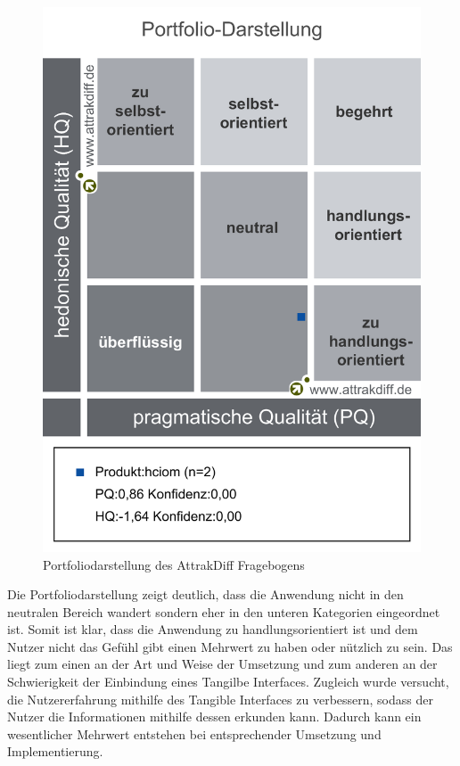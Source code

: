 \documentclass[runningheads,a4paper, 12pt]{llncs}
\begin{document}
\begin{figure}[H]
	\centering
	\includegraphics[angle=0,scale=0.5]{attrakdiff_result3}
	\caption{Portfoliodarstellung des AttrakDiff Fragebogens}
	\label{fig:result6}
\end{figure}

Die Portfoliodarstellung zeigt deutlich, dass die Anwendung nicht in den neutralen Bereich wandert sondern eher in den unteren Kategorien eingeordnet ist. Somit ist klar, dass die Anwendung zu handlungsorientiert ist und dem Nutzer nicht das Gefühl gibt einen Mehrwert zu haben oder nützlich zu sein. Das liegt zum einen an der Art und Weise der Umsetzung und zum anderen an der Schwierigkeit der Einbindung eines Tangilbe Interfaces. Zugleich wurde versucht, die Nutzererfahrung mithilfe des Tangible Interfaces zu verbessern, sodass der Nutzer die Informationen mithilfe dessen erkunden kann. Dadurch kann ein wesentlicher Mehrwert entstehen bei entsprechender Umsetzung und Implementierung.
\end{document}
